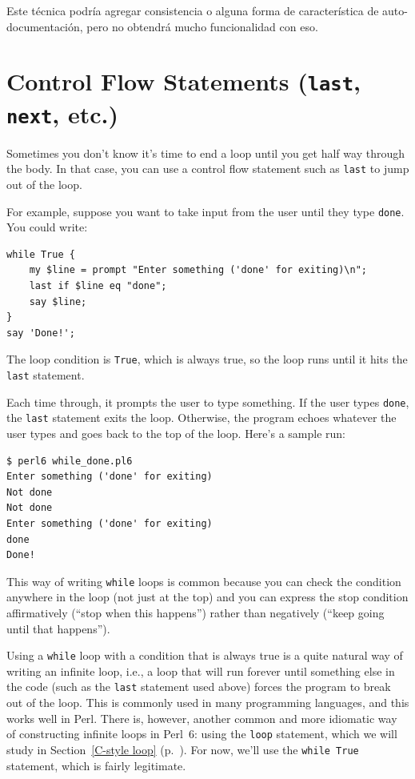 Este técnica podría agregar consistencia o alguna forma
de característica de auto-documentación, pero no obtendrá
mucho funcionalidad con eso.
 

\section{Control Flow Statements ({\tt last}, {\tt next}, etc.)}

Sometimes you don't know it's time to end a loop until you get half
way through the body.  In that case, you can use a control flow 
statement such as {\tt last} to jump out of the loop.

For example, suppose you want to take input from the user until they
type {\tt done}.  You could write:

\begin{verbatim}
while True {
    my $line = prompt "Enter something ('done' for exiting)\n";
    last if $line eq "done";
    say $line;
}
say 'Done!';
\end{verbatim}
%
The loop condition is {\tt True}, which is always true, so the
loop runs until it hits the {\tt last} statement.

Each time through, it prompts the user to type something.
If the user types {\tt done}, the {\tt last} statement exits
the loop.  Otherwise, the program echoes whatever the user types
and goes back to the top of the loop.  Here's a sample run:

\begin{verbatim}
$ perl6 while_done.pl6
Enter something ('done' for exiting)
Not done
Not done
Enter something ('done' for exiting)
done
Done!
\end{verbatim}
%
This way of writing {\tt while} loops is common because you
can check the condition anywhere in the loop (not just at the
top) and you can express the stop condition affirmatively
(``stop when this happens'') rather than negatively (``keep 
going until that happens'').

Using a {\tt while} loop with a condition that is always true 
is a quite natural way of writing an infinite loop, i.e., a 
loop that will run forever until something else in the code 
(such as the {\tt last} statement used above) forces the 
program to break out of the loop. This is commonly used in 
many programming languages, and this works well in Perl. There 
is, however, another common and more idiomatic way of constructing 
infinite loops in Perl~6: using the {\tt loop} statement, 
which we will study in Section~\ref{C-style loop} 
(p.~\pageref{C-style loop}). For now, we'll use the {\tt while True} 
statement, which is fairly legitimate.

